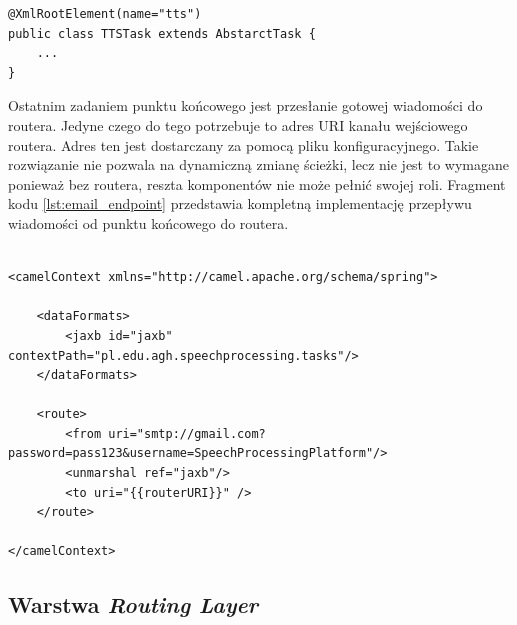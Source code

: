 \lstset{language=Java, tabsize=4, caption=Definicja klasy TTSTask wraz z adnotacjami JAXB .,label=lst:jaxb_annotation}

\begin{center}
\begin{lstlisting}
@XmlRootElement(name="tts")
public class TTSTask extends AbstarctTask {
	...
}
\end{lstlisting}
\end{center}

Ostatnim zadaniem punktu końcowego jest przesłanie gotowej wiadomości do routera. Jedyne czego do tego potrzebuje to adres URI kanału wejściowego routera. Adres ten jest dostarczany za pomocą pliku konfiguracyjnego. Takie rozwiązanie nie pozwala na dynamiczną zmianę ścieżki, lecz nie jest to wymagane ponieważ bez routera, reszta komponentów nie może pełnić swojej roli.
Fragment kodu \ref{lst:email_endpoint} przedstawia kompletną implementację przepływu wiadomości od punktu końcowego do routera.

\lstset{language=XML, tabsize=4, caption=Przykładowa\, kompletna implementacja przypływu wiadomości od punktu końcowego do routera przy pomocy XML DSL.,label=lst:email_endpoint}

\begin{center}
\begin{lstlisting}

<camelContext xmlns="http://camel.apache.org/schema/spring">

	<dataFormats>
		<jaxb id="jaxb" contextPath="pl.edu.agh.speechprocessing.tasks"/>
	</dataFormats>

	<route>
		<from uri="smtp://gmail.com?password=pass123&username=SpeechProcessingPlatform"/>
		<unmarshal ref="jaxb"/>
		<to uri="{{routerURI}}" />
	</route>

</camelContext>
\end{lstlisting}
\end{center}


\subsection{Warstwa \textit{Routing Layer}}

